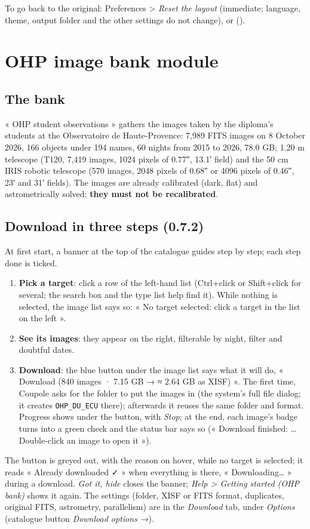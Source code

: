 To go back to the original: Preferences > \emph{Reset the layout} (immediate; language, theme, output folder and the
other settings do not change), or  ().

\section{OHP image bank module}
\subsection{The bank}
« OHP student observations » gathers the images taken by the diploma's students at the Observatoire de
Haute-Provence: 7,989 FITS images on 8 October 2026, 166 objects under 194 names, 60 nights from 2015 to 2026,
78.0 GB; 1.20 m telescope (T120, 7,419 images, 1024 pixels of 0.77″, 13.1′ field) and the 50 cm IRIS robotic
telescope (570 images, 2048 pixels of 0.68″ or 4096 pixels of 0.46″, 23′ and 31′ fields). The images are already
calibrated (dark, flat) and astrometrically solved: \textbf{they must not be recalibrated}.

\subsection{Download in three steps (0.7.2)}\label{sec:trois-gestes}
At first start, a banner at the top of the catalogue guides step by step; each step done is ticked.
\begin{enumerate}[leftmargin=*,itemsep=1pt]
\item \textbf{Pick a target}: click a row of the left-hand list (Ctrl+click or Shift+click for several; the search
  box and the type list help find it). While nothing is selected, the image list says so: « No target selected:
  click a target in the list on the left ».
\item \textbf{See its images}: they appear on the right, filterable by night, filter and doubtful dates.
\item \textbf{Download}: the blue button under the image list says what it will do, « Download (840 images ·
  7.15 GB → ≈ 2.64 GB as XISF) ». The first time, Coupole asks for the folder to put the images in (the system's full
  file dialog; it creates \texttt{OHP\_DU\_ECU} there); afterwards it reuses the same folder and format. Progress
  shows under the button, with \emph{Stop}; at the end, each image's badge turns into a green check and the status bar
  says so (« Download finished: … Double-click an image to open it »).
\end{enumerate}
The button is greyed out, with the reason on hover, while no target is selected; it reads « Already downloaded ✓ »
when everything is there, « Downloading… » during a download. \emph{Got it, hide} closes the banner;
\emph{Help > Getting started (OHP bank)} shows it again. The settings (folder, XISF or FITS format, duplicates,
original FITS, astrometry, parallelism) are in the \emph{Download} tab, under \emph{Options} (catalogue button
\emph{Download options →}).

